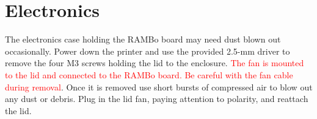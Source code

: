\section{Electronics}
The electronics case holding the RAMBo board may need dust blown out occasionally. Power down the printer and use the provided 2.5-mm driver to remove the four M3 screws holding the lid to the enclosure. \textcolor{red}{The fan is mounted to the lid and connected to the RAMBo board. Be careful with the fan cable during removal}. Once it is removed use short bursts of compressed air to blow out any dust or debris. Plug in the lid fan, paying attention to polarity, and reattach the lid.
